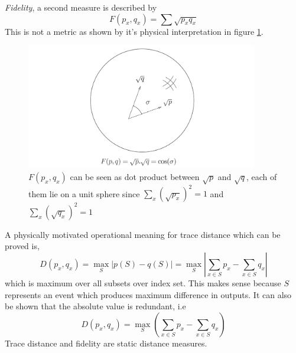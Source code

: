 \textit{Fidelity}, a second measure is described by
\begin{equation}
    F(p_x, q_x) = \sum \sqrt{p_xq_x}
\end{equation}
This is not a metric as shown by it's physical interpretation in figure \ref{fig:fidelity-distance}.
\begin{figure}
    \centering
    \includegraphics[width=0.9\textwidth]{images/fidelity_distance.png}
    \caption{$F(p_x,q_x)$ can be seen as dot product between $\sqrt{p}$ and $\sqrt{q}$, each of them lie on a unit sphere since $\sum_x \left( \sqrt{p_x} \right)^2 = 1$ and $\sum_x \left( \sqrt{q_x} \right)^2 = 1$}
    \label{fig:fidelity-distance}
\end{figure}

A physically motivated operational meaning for trace distance which can be proved is,
\begin{equation}
    D(p_x, q_x) = \max_S |p(S) - q(S)| = \max_S \left| \sum_{x\in S} p_x - \sum_{x \in S} q_x \right|
\end{equation}
which is maximum over all subsets over index set. This makes sense because $S$ represents an event which produces maximum difference in outputs. It can also be shown that the absolute value is redundant, i.e
\begin{equation}
    D(p_x, q_x) = \max_S \left( \sum_{x\in S} p_x - \sum_{x \in S} q_x\right)
\end{equation}
Trace distance and fidelity are static distance measures.

